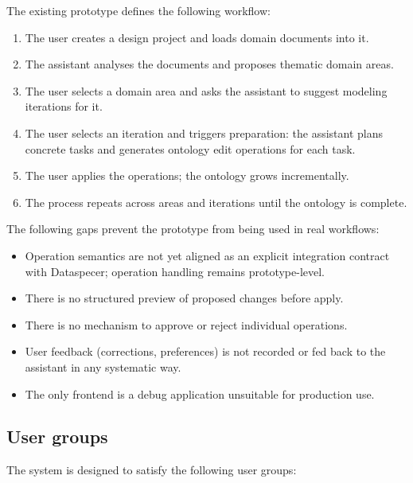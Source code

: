 \documentclass{article}
\begin{document}
The existing prototype defines the following workflow:

\begin{enumerate}
  \item The user creates a design project and loads domain documents into it.
  \item The assistant analyses the documents and proposes thematic domain areas.
  \item The user selects a domain area and asks the assistant to suggest modeling iterations for it.
  \item The user selects an iteration and triggers preparation: the assistant plans concrete tasks and generates ontology edit operations for each task.
  \item The user applies the operations; the ontology grows incrementally.
  \item The process repeats across areas and iterations until the ontology is complete.
\end{enumerate}

The following gaps prevent the prototype from being used in real workflows:

\begin{itemize}
  \item Operation semantics are not yet aligned as an explicit integration contract with Dataspecer; operation handling remains prototype-level.
  \item There is no structured preview of proposed changes before apply.
  \item There is no mechanism to approve or reject individual operations.
  \item User feedback (corrections, preferences) is not recorded or fed back to the assistant in any systematic way.
  \item The only frontend is a debug application unsuitable for production use.
\end{itemize}



\subsection{User groups}

The system is designed to satisfy the following user groups:
\end{document}
